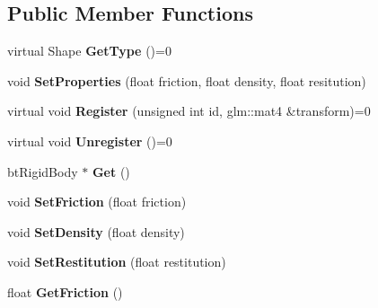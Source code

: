\subsection*{Public Member Functions}
\begin{DoxyCompactItemize}
\item 
\mbox{\label{classTarbora_1_1RigidBody_a556015b764b083c39f1841e5914a8143}} 
virtual Shape {\bfseries Get\+Type} ()=0
\item 
\mbox{\label{classTarbora_1_1RigidBody_a0ec675847bf2c6e5f34002eab0c29ef0}} 
void {\bfseries Set\+Properties} (float friction, float density, float resitution)
\item 
\mbox{\label{classTarbora_1_1RigidBody_a5f41c214aabe2a7f069a317cb755f0f1}} 
virtual void {\bfseries Register} (unsigned int id, glm\+::mat4 \&transform)=0
\item 
\mbox{\label{classTarbora_1_1RigidBody_a1ef83d0b9b2c9901807d584aa563dafb}} 
virtual void {\bfseries Unregister} ()=0
\item 
\mbox{\label{classTarbora_1_1RigidBody_a00257ff89337c1c4046c6ba1d1c72256}} 
bt\+Rigid\+Body $\ast$ {\bfseries Get} ()
\item 
\mbox{\label{classTarbora_1_1RigidBody_a9408bdeb536881e29f3706bb061220d2}} 
void {\bfseries Set\+Friction} (float friction)
\item 
\mbox{\label{classTarbora_1_1RigidBody_a154ac3b0b5f1e6da32ee6e02b65822d8}} 
void {\bfseries Set\+Density} (float density)
\item 
\mbox{\label{classTarbora_1_1RigidBody_a60ba7ea96ffada37237ce4345b58eb23}} 
void {\bfseries Set\+Restitution} (float restitution)
\item 
\mbox{\label{classTarbora_1_1RigidBody_aaafbb1c80dc9c4dc13e1dc3e3db08f6e}} 
float {\bfseries Get\+Friction} ()
\item 
\mbox{\label{classTarbora_1_1RigidBody_a8bf56fa1c8bc30bd8e7950f879e5b441}} 

\end{DoxyCompactItemize}
